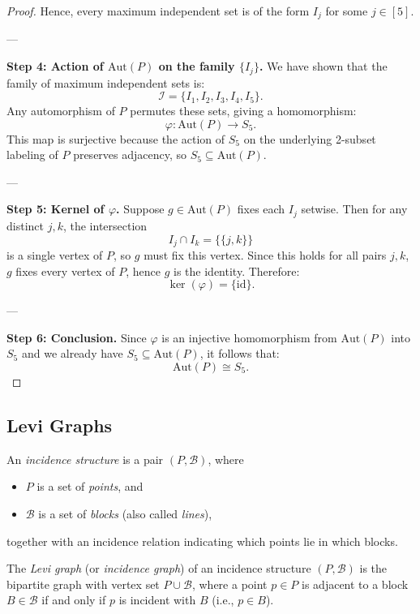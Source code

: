 \documentclass[12pt,a4paper,openany]{book}
\begin{document}
\begin{proof}
Hence, every maximum independent set is of the form \(I_j\) for some \(j \in [5]\).

---

\textbf{Step 4: Action of \(\mathrm{Aut}(P)\) on the family \(\{I_j\}\).}  
We have shown that the family of maximum independent sets is:
\[
\mathcal{I} = \{I_1, I_2, I_3, I_4, I_5\}.
\]
Any automorphism of \(P\) permutes these sets, giving a homomorphism:
\[
\varphi: \mathrm{Aut}(P) \to S_5.
\]
This map is surjective because the action of \(S_5\) on the underlying 2-subset labeling of \(P\) preserves adjacency, so \(S_5 \subseteq \mathrm{Aut}(P)\).

---

\textbf{Step 5: Kernel of \(\varphi\).}  
Suppose \(g \in \mathrm{Aut}(P)\) fixes each \(I_j\) setwise. Then for any distinct \(j,k\), the intersection
\[
I_j \cap I_k = \{\{j,k\}\}
\]
is a single vertex of \(P\), so \(g\) must fix this vertex. Since this holds for all pairs \(j,k\), \(g\) fixes every vertex of \(P\), hence \(g\) is the identity. Therefore:
\[
\ker(\varphi) = \{ \mathrm{id} \}.
\]

---

\textbf{Step 6: Conclusion.}  
Since \(\varphi\) is an injective homomorphism from \(\mathrm{Aut}(P)\) into \(S_5\) and we already have \(S_5 \subseteq \mathrm{Aut}(P)\), it follows that:
\[
\mathrm{Aut}(P) \cong S_5.
\]
\end{proof}

\subsection*{ Levi Graphs}


\noindent An \emph{incidence structure} is a pair $(P, \mathcal{B})$, where 
\begin{itemize}
    \item $P$ is a set of \emph{points}, and
    \item $\mathcal{B}$ is a set of \emph{blocks} (also called \emph{lines}),
\end{itemize}
together with an incidence relation indicating which points lie in which blocks.  

\bigskip

\noindent The \emph{Levi graph} (or \emph{incidence graph}) of an incidence structure $(P, \mathcal{B})$ is the bipartite graph with vertex set $P \cup \mathcal{B}$, where a point $p \in P$ is adjacent to a block $B \in \mathcal{B}$ if and only if $p$ is incident with $B$ (i.e., $p \in B$).
\end{document}
